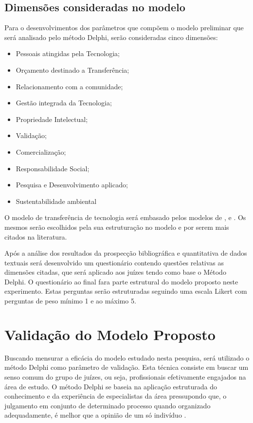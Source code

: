 \subsection{Dimensões consideradas no modelo}


Para o desenvolvimentos dos parâmetros que compõem o modelo preliminar que será analisado pelo método Delphi, serão consideradas cinco dimensões:

\begin{multicols}{2}
\centering
    \begin{itemize}
    \item{Pessoais atingidas pela Tecnologia;}
\item{Orçamento destinado a Transferência;}
\item{Relacionamento com a comunidade;}
\item{Gestão integrada da Tecnologia;}
\item{Propriedade Intelectual;}
\item{Validação;}
\item{Comercialização;}
\item{Responsabilidade Social;}
\item{Pesquisa e Desenvolvimento aplicado;}
\item{Sustentabilidade ambiental}
\end{itemize}
\end{multicols}


O modelo de transferência de tecnologia será embasado pelos modelos de ,  e . Os mesmos serão escolhidos pela sua estruturação no modelo e por serem mais citados na literatura.

Após a análise dos resultados da prospecção bibliográfica e  quantitativa de dados textuais será desenvolvido um questionário contendo questões relativas as dimensões citadas, que será aplicado aos juízes tendo como base o Método Delphi. O questionário ao final fara parte estrutural do modelo proposto neste experimento. Estas perguntas serão estruturadas seguindo uma escala Likert com perguntas de peso mínimo 1 e ao máximo 5. 


\section{Validação do Modelo Proposto}


Buscando mensurar a eficácia do modelo estudado nesta pesquisa, será utilizado o método Delphi como parâmetro de validação. Esta técnica consiste em buscar um senso comum do grupo de juízes, ou seja, profissionais efetivamente engajados na área de estudo. O método Delphi se baseia na aplicação estruturada do conhecimento e da experiência de especialistas da área pressupondo que, o julgamento em conjunto de determinado processo quando organizado adequadamente, é melhor que a opinião de um só indivíduo \cite{faro_tecnica_1997,santiago_matriz_2012}. 

